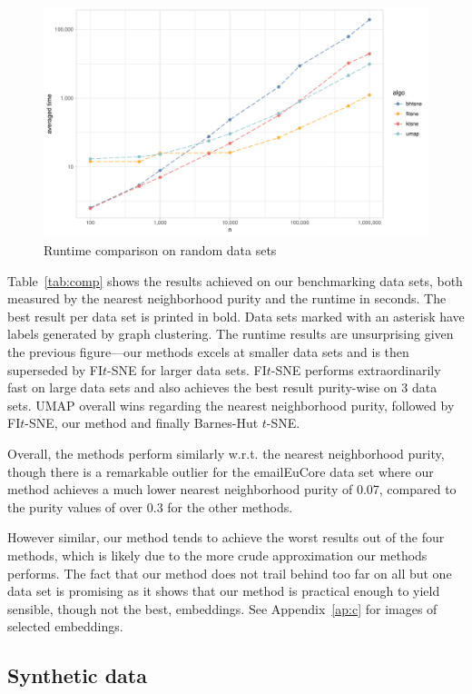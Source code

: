 \begin{figure}[tb]
  \centering
  \includegraphics[width=\textwidth]{img/runtime_comparison}
  \caption{Runtime comparison on random data sets}
  \label{fig:runtime-comp}
\end{figure}

Table~\ref{tab:comp} shows the results achieved on our benchmarking data sets, both
measured by the nearest neighborhood purity and the runtime in seconds. The best result
per data set is printed in bold. Data sets marked with an asterisk have labels generated
by graph clustering. The runtime results are unsurprising given the previous
figure---our methods excels at smaller data sets and is then superseded by FI$t$-SNE
for larger data sets. FI$t$-SNE performs extraordinarily fast on large data sets and
also achieves the best result purity-wise on 3 data sets. UMAP overall wins regarding
the nearest neighborhood purity, followed by FI$t$-SNE, our method and finally Barnes-Hut
$t$-SNE.

Overall, the methods perform similarly w.r.t. the nearest neighborhood purity,
though there is a remarkable outlier for the emailEuCore data set where our
method achieves a much lower nearest neighborhood purity of 0.07, compared to
the purity values of over 0.3 for the other methods.

However similar, our method tends to achieve the worst results out of the four
methods, which is likely due to the more crude approximation our methods
performs. The fact that our method does not trail behind too far on all but one
data set is promising as it shows that our method is practical enough to yield
sensible, though not the best, embeddings. See Appendix~\ref{ap:c} for images of
selected embeddings.

\subsection{Synthetic data}

